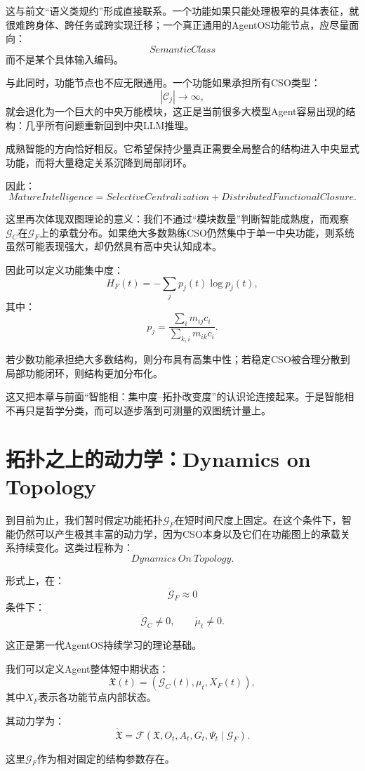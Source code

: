 这与前文“语义类规约”形成直接联系。一个功能如果只能处理极窄的具体表征，就很难跨身体、跨任务或跨实现迁移；一个真正通用的AgentOS功能节点，应尽量面向：
\[
SemanticClass
\]
而不是某个具体输入编码。

与此同时，功能节点也不应无限通用。一个功能如果承担所有CSO类型：
\[
|\mathcal C_j|\rightarrow\infty,
\]
就会退化为一个巨大的中央万能模块，这正是当前很多大模型Agent容易出现的结构：几乎所有问题重新回到中央LLM推理。

成熟智能的方向恰好相反。它希望保持少量真正需要全局整合的结构进入中央显式功能，而将大量稳定关系沉降到局部闭环。

因此：
\[
\boxed{
MatureIntelligence
=
SelectiveCentralization
+
DistributedFunctionalClosure.
}
\]

这里再次体现双图理论的意义：我们不通过“模块数量”判断智能成熟度，而观察$\mathcal G_C$在$\mathcal G_F$上的承载分布。如果绝大多数熟练CSO仍然集中于单一中央功能，则系统虽然可能表现强大，却仍然具有高中央认知成本。

因此可以定义功能集中度：
\[
H_F(t)
=
-\sum_j
p_j(t)\log p_j(t),
\]
其中：
\[
p_j
=
\frac{
\sum_i m_{ij}c_i
}{
\sum_{k,i}m_{ik}c_i
}.
\]

若少数功能承担绝大多数结构，则分布具有高集中性；若稳定CSO被合理分散到局部功能闭环，则结构更加分布化。

这又把本章与前面“智能相：集中度--拓扑改变度”的认识论连接起来。于是智能相不再只是哲学分类，而可以逐步落到可测量的双图统计量上。

\section{拓扑之上的动力学：Dynamics on Topology}

到目前为止，我们暂时假定功能拓扑$\mathcal G_F$在短时间尺度上固定。在这个条件下，智能仍然可以产生极其丰富的动力学，因为CSO本身以及它们在功能图上的承载关系持续变化。这类过程称为：
\[
\boxed{
Dynamics\ On\ Topology.
}
\]

形式上，在：
\[
\dot{\mathcal G}_F\approx0
\]
条件下：
\[
\dot{\mathcal G}_C\neq0,
\qquad
\dot\mu_t\neq0.
\]

这正是第一代AgentOS持续学习的理论基础。

我们可以定义Agent整体短中期状态：
\[
\mathfrak X(t)
=
\left(
\mathcal G_C(t),
\mu_t,
X_F(t)
\right),
\]
其中$X_F$表示各功能节点内部状态。

其动力学为：
\[
\dot{\mathfrak X}
=
\mathcal F
\left(
\mathfrak X,
O_t,
A_t,
G_t,
\Psi_t
\mid
\mathcal G_F
\right).
\]

这里$\mathcal G_F$作为相对固定的结构参数存在。

